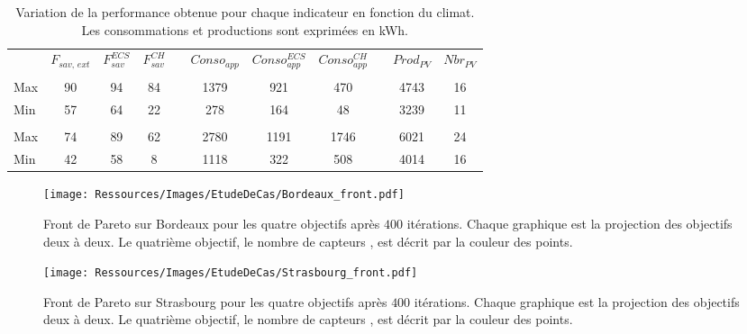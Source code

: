\begin{table}
\centering
\caption[Performance maximale pouvant être obtenue pour différents indicateurs]
         {Variation de la performance obtenue pour chaque indicateur en fonction du climat.
          Les consommations et productions sont exprimées en \si{kWh}.}
\label{tab:bornes_front_pareto}
\begin{tabular}{L{2cm} c c c c c c c c c c}
    \toprule
                & $F_{sav,\,ext}$ & $F_{sav}^{ECS}$ & $F_{sav}^{CH}$ & & $Conso_{app}$ & $Conso_{app}^{ECS}$ & $Conso_{app}^{CH}$ & & $Prod_{PV}$ & $Nbr_{PV}$ \\
    \addlinespace
     \\
    \midrule
    Max & 90  & 94  & 84  &   & 1379  & 921 & 470 &   & 4743  & 16  \\
    Min & 57  & 64  & 22  &   & 278 & 164 & 48  &   & 3239  & 11  \\
    \addlinespace
     \\
    \midrule
    Max & 74  & 89  & 62  &   & 2780  & 1191  & 1746  &   & 6021  &  24 \\
    Min & 42  & 58  & 8 &   & 1118  & 322 & 508 &   & 4014  & 16  \\
    \bottomrule
\end{tabular}
\end{table}


\begin{figure}
    \centering
    \texttt{[image: Ressources/Images/EtudeDeCas/Bordeaux\_front.pdf]}
    \caption[Front de Pareto sur Bordeaux pour les quatre objectifs après $400$ itérations]
             {Front de Pareto sur Bordeaux pour les quatre objectifs après $400$ itérations.
              Chaque graphique est la projection des objectifs deux à deux.
              Le quatrième objectif, le nombre de capteurs , est décrit par la couleur des points.}
    \label{fig:front_pareto_bordeaux}
\end{figure}

\begin{figure}
    \centering
    \texttt{[image: Ressources/Images/EtudeDeCas/Strasbourg\_front.pdf]}
    \caption[Front de Pareto sur Strasbourg pour les quatre objectifs après $400$ itérations]
             {Front de Pareto sur Strasbourg pour les quatre objectifs après $400$ itérations.
              Chaque graphique est la projection des objectifs deux à deux.
              Le quatrième objectif, le nombre de capteurs , est décrit par la couleur des points.}
    \label{fig:front_pareto_strasbourg}
\end{figure}

